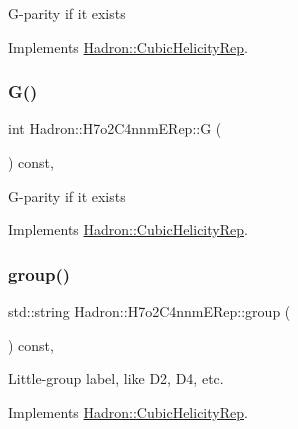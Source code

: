 G-\/parity if it exists 

Implements \mbox{\hyperlink{structHadron_1_1CubicHelicityRep_a50689f42be1e6170aa8cf6ad0597018b}{Hadron\+::\+Cubic\+Helicity\+Rep}}.

\mbox{\label{structHadron_1_1H7o2C4nnmERep_a55e0c3bf732ef6bd2ae6b0948fa7e21c}} 
\subsubsection{\texorpdfstring{G()}{G()}\hspace{0.1cm}{\footnotesize\ttfamily [2/2]}}
{\footnotesize\ttfamily int Hadron\+::\+H7o2\+C4nnm\+E\+Rep\+::G (\begin{DoxyParamCaption}{ }\end{DoxyParamCaption}) const\hspace{0.3cm}{\ttfamily [inline]}, {\ttfamily [virtual]}}

G-\/parity if it exists 

Implements \mbox{\hyperlink{structHadron_1_1CubicHelicityRep_a50689f42be1e6170aa8cf6ad0597018b}{Hadron\+::\+Cubic\+Helicity\+Rep}}.

\mbox{\label{structHadron_1_1H7o2C4nnmERep_ac3302d0096df1ab32253be3f3e289b83}} 
\subsubsection{\texorpdfstring{group()}{group()}\hspace{0.1cm}{\footnotesize\ttfamily [1/2]}}
{\footnotesize\ttfamily std\+::string Hadron\+::\+H7o2\+C4nnm\+E\+Rep\+::group (\begin{DoxyParamCaption}{ }\end{DoxyParamCaption}) const\hspace{0.3cm}{\ttfamily [inline]}, {\ttfamily [virtual]}}

Little-\/group label, like D2, D4, etc. 

Implements \mbox{\hyperlink{structHadron_1_1CubicHelicityRep_a101a7d76cd8ccdad0f272db44b766113}{Hadron\+::\+Cubic\+Helicity\+Rep}}.

\mbox{\label{structHadron_1_1H7o2C4nnmERep_ac3302d0096df1ab32253be3f3e289b83}} 
